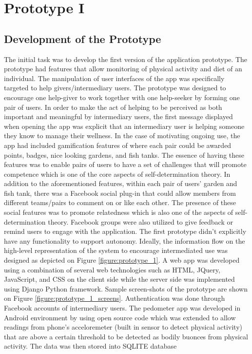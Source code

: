 
\chapter{Prototype I} %

\label{prototype1chapter} %

\section{Development of the Prototype}
The initial task was to develop the first version of the application prototype. The prototype had features that allow monitoring of physical activity and diet of an individual. The manipulation of user interfaces of the app was specifically targeted to help givers/intermediary users. The prototype was designed to encourage one help-giver to work together with one help-seeker by forming one pair of users. In order to make the act of helping to be perceived as both important and meaningful by intermediary users, the first message displayed when opening the app was explicit that an intermediary user is helping someone they know to manage their wellness. In the case of motivating ongoing use, the app had included gamification features of where each pair could be awarded points, badges, nice looking gardens, and fish tanks. The essence of having these features was to enable pairs of users to have a set of challenges that will promote competence which is one of the core aspects of self-determination theory. In addition to the aforementioned features, within each pair of users' garden and fish tank, there was a Facebook social plug-in that could allow members from different teams/pairs to comment on or like each other. The presence of these social features was to promote relatedness which is also one of the aspects of self-determination theory. Facebook groups were also utilized to give feedback or remind users to engage with the application. The first prototype didn't explicitly have any functionality to support autonomy. Ideally, the information flow on the high-level representation of the system to encourage intermediated use was designed as depicted on Figure \ref{figure:prototype_1}. A web app was developed using a combination of several web technologies such as HTML, JQuery, JavaScript, and CSS on the client side while the server side was implemented using Django Python framework. Sample screen-shots of the prototype are shown on Figure \ref{figure:prototype_1_screens}. Authentication was done through Facebook accounts of intermediary users. The pedometer app was developed in Android environment by using open source code which was extended to allow readings from phone's acceloremeter (built in sensor to detect physical activity) that are above a certain threshold to be detected as bodily buonces from physical activity. The data was then stored into SQLITE database 